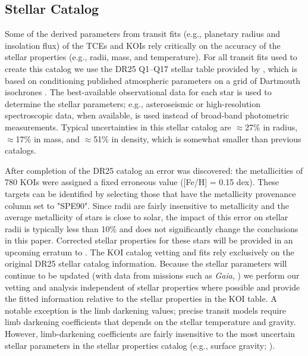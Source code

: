 \subsection{Stellar Catalog}
\label{s:stars}
Some of the derived parameters from transit fits (e.g., planetary radius and insolation flux) of the TCEs and KOIs rely critically on the accuracy of the stellar properties (e.g., radii, mass, and temperature). For all transit fits used to create this catalog we use the DR25 Q1--Q17 stellar table provided by \citet{Mathur2017ApJS}, which is based on conditioning published atmospheric parameters on a grid of Dartmouth isochrones \citep{Dotter2008}. The best-available observational data for each star is used to determine the stellar parameters; e.g., asteroseismic or high-resolution spectroscopic data, when available, is used instead of broad-band photometric measurements. Typical uncertainties in this stellar catalog are $\approx$27\% in radius, $\approx$17\% in mass, and $\approx$51\% in density, which is somewhat smaller than previous catalogs.

After completion of the DR25 catalog an error was discovered: the metallicities of 780 KOIs were assigned a fixed erroneous value ([Fe/H] = 0.15 dex). These targets can be identified by selecting those that have the metallicity provenance column set to "SPE90". Since radii are fairly insensitive to metallicity and the average metallicity of \Kepler{} stars is close to solar, the impact of this error on stellar radii is typically less than 10\% and does not significantly change the conclusions in this paper. Corrected stellar properties for these stars will be provided in an upcoming erratum to \citet{Mathur2017ApJS}. The KOI catalog vetting and fits rely exclusively on the original DR25 stellar catalog information. Because the stellar parameters will continue to be updated (with data from missions such as \emph{Gaia}, \citealt{gaia1,gaia2}) we perform our vetting and analysis independent of stellar properties where possible and provide the fitted information relative to the stellar properties in the KOI table.  A notable exception is the limb darkening values; precise transit models require limb darkening coefficients that depends on the stellar temperature and gravity. However, limb-darkening coefficients are fairly insensitive to the most uncertain stellar parameters in the stellar properties catalog (e.g., surface gravity; \citealt{Claret2000}).
